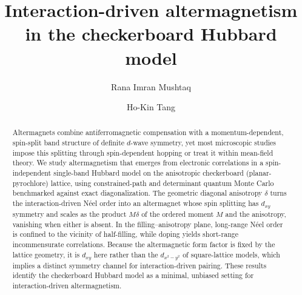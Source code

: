 \documentclass[reprint,superscriptaddress,amsmath,amssymb,aps,prb,longbibliography]{revtex4-2}
\begin{document}
 
\flushbottom
\title{Interaction-driven altermagnetism in the checkerboard Hubbard model}
\author{Rana Imran Mushtaq}





\author{Ho-Kin Tang}

\begin{abstract}
Altermagnets combine antiferromagnetic compensation with a momentum-dependent, spin-split band structure of definite $d$-wave symmetry, yet most microscopic studies impose this splitting through spin-dependent hopping or treat it within mean-field theory. We study altermagnetism that emerges from electronic correlations in a
spin-independent single-band Hubbard model on the anisotropic checkerboard (planar-pyrochlore) lattice, using constrained-path and determinant quantum Monte Carlo benchmarked against exact diagonalization. The geometric diagonal anisotropy $\delta$ turns the interaction-driven N\'eel order into an altermagnet whose spin splitting has $d_{xy}$ symmetry and scales as the product $M\delta$ of the ordered moment $M$ and the anisotropy, vanishing when either is absent. In the filling--anisotropy plane, long-range N\'eel order is confined to the
vicinity of half-filling, while doping yields short-range incommensurate correlations. Because the altermagnetic form factor is fixed by the lattice geometry, it is $d_{xy}$ here rather than the $d_{x^2-y^2}$ of
square-lattice models, which implies a distinct symmetry channel for interaction-driven pairing. These results identify the checkerboard Hubbard model as a minimal, unbiased setting for interaction-driven altermagnetism.
\end{abstract}
\end{document}
